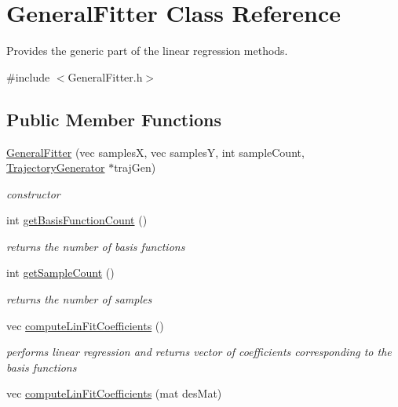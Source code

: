 \hypertarget{classGeneralFitter}{\section{\-General\-Fitter \-Class \-Reference}
\label{classGeneralFitter}
}


\-Provides the generic part of the linear regression methods.  




{\ttfamily \#include $<$\-General\-Fitter.\-h$>$}

\subsection*{\-Public \-Member \-Functions}
\begin{DoxyCompactItemize}
\item 
\hyperlink{classGeneralFitter_a4177255144dd28bfad12437e558ce932}{\-General\-Fitter} (vec samples\-X, vec samples\-Y, int sample\-Count, \hyperlink{classTrajectoryGenerator}{\-Trajectory\-Generator} $\ast$traj\-Gen)
\begin{DoxyCompactList}\small\item\em constructor \end{DoxyCompactList}\item 
int \hyperlink{classGeneralFitter_aa3fadbccff7bafede20ec9344ee4167a}{get\-Basis\-Function\-Count} ()
\begin{DoxyCompactList}\small\item\em returns the number of basis functions \end{DoxyCompactList}\item 
int \hyperlink{classGeneralFitter_a3d1d98a54d99a1dfd2d86a3b1b0632a8}{get\-Sample\-Count} ()
\begin{DoxyCompactList}\small\item\em returns the number of samples \end{DoxyCompactList}\item 
vec \hyperlink{classGeneralFitter_ad5cb0fdd4dfd2a8ab765f8b4a6a8d4d2}{compute\-Lin\-Fit\-Coefficients} ()
\begin{DoxyCompactList}\small\item\em performs linear regression and returns vector of coefficients corresponding to the basis functions \end{DoxyCompactList}\item 
vec \hyperlink{classGeneralFitter_ad8cb235ca20c654263f0e163436825bb}{compute\-Lin\-Fit\-Coefficients} (mat des\-Mat)

\end{DoxyCompactItemize}
